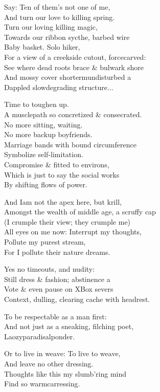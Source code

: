 Say: Ten of them's not one of me, \\
And turn our love to killing spring. \\
Turn our loving killing magic, \\
Towards our ribbon sycthe, barbed wire \\
Baby basket. Solo hiker, \\
For a view of a creekside cutout, forcecarved: \\
See where dead roots brace \& bulwark shore \\
And mossy cover shortermundisturbed a \\
Dappled slowdegrading structure... 

Time to toughen up. \\
A musclepath so concretized \& consecrated. \\
No more sitting, waiting. \\
No more backup boyfriends. \\
Marriage bands with bound circumference \\
Symbolize self-limitation. \\
Compromise \& fitted to environs, \\
Which is just to say the social works \\
By shifting flows of power.

And Iam not the apex here, but krill, \\
Amongst the wealth of middle age, a scruffy cap \\
(I crumple their view; they crumple me) \\
All eyes on me now: Interrupt my thoughts, \\
Pollute my purest stream, \\
For I pollute their nature dreams.

Yes no timeouts, and nudity: \\
Still dress \& fashion; abstinence a \\
Vote \& even pause on XBox severs \\
Context, dulling, clearing cache with headrest.

To be respectable as a man first: \\
And not just as a sneaking, filching poet, \\
Laozyparadisalponder.

Or to live in weave: To live to weave, \\
And leave no other dressing. \\
Thoughts like this my slumb'ring mind \\
Find so warmcarressing.

